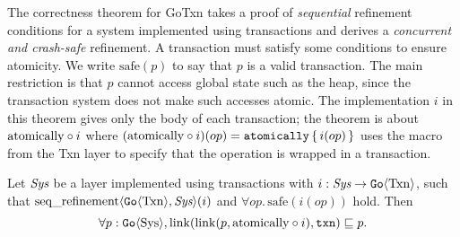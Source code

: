 The correctness theorem for GoTxn takes a proof of \emph{sequential} refinement
conditions for a system implemented using transactions and derives a \emph{concurrent and crash-safe} refinement.
A transaction must satisfy some conditions to ensure atomicity. We write
$\mathrm{safe}(p)$ to say that $p$ is a valid transaction. The main
restriction is that $p$ cannot access global state such as the heap, since
the transaction system does not make such accesses atomic.
The implementation $i$
in this theorem gives only the body of each transaction; the theorem is about
$\mathrm{atomically}\circ i$ where $(\mathrm{atomically}\circ i)(op) = \mathtt{atomically}\,\{\, i(op) \,\}$ uses
the macro from the Txn layer to specify that the
operation is wrapped in a transaction.
\begin{theorem}
  Let $\textit{Sys}$ be a layer implemented using transactions with
$i : \textit{Sys} \to \mathtt{Go}\langle \mathrm{Txn} \rangle$, such that
$\operatorname{seq\_refinement}\langle \mathtt{Go}\langle \mathrm{Txn} \rangle, \textit{Sys} \rangle(i)$ and
$\forall op.\, \mathrm{safe}(i(op))$ hold. Then
\[
  \forall p : \mathtt{Go}\langle \mathrm{Sys} \rangle, \mathrm{link}(\mathrm{link}(p, \mathrm{atomically}\circ i), \texttt{txn}) \sqsubseteq p.
\]
\label{thm:gotxn-transfer}
\end{theorem}
